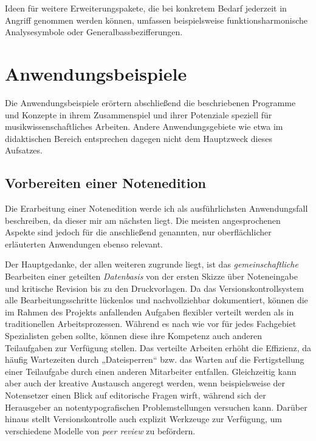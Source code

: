 \documentclass[DIV=12]{scrreprt}
\begin{document}
\bigskip
Ideen für weitere Erweiterungspakete, die bei konkretem Bedarf jederzeit in Angriff genommen werden können, umfassen beispielsweise funktionsharmonische Analysesymbole oder Generalbassbezifferungen.

\chapter{Anwendungsbeispiele}
\label{chap:pt_applications}

Die Anwendungsbeispiele erörtern abschließend die beschriebenen Programme und Konzepte in ihrem Zusammenspiel und ihrer Potenziale speziell für musikwissenschaftliches Arbeiten.
Andere Anwendungsgebiete wie etwa im didaktischen Bereich entsprechen dagegen nicht dem Hauptzweck dieses Aufsatzes.

\section{Vorbereiten einer Notenedition}
\label{sec:pt_preparing-edition}
Die Erarbeitung einer Notenedition werde ich als ausführlichsten Anwendungsfall beschreiben, da dieser mir am nächsten liegt.
Die meisten angesprochenen Aspekte sind jedoch für die anschließend genannten, nur oberflächlicher erläuterten Anwendungen ebenso relevant.

\medskip
 
Der Hauptgedanke, der allen weiteren zugrunde liegt, ist das \emph{gemeinschaftliche} Bearbeiten einer geteilten \emph{Datenbasis} von der ersten Skizze über Noteneingabe und kritische Revision bis zu den Druckvorlagen.
Da das Versionskontrollsystem alle Bearbeitungsschritte lückenlos und nachvollziehbar dokumentiert, können die im Rahmen des Projekts anfallenden Aufgaben flexibler verteilt werden als in traditionellen Arbeitsprozessen.
Während es nach wie vor für jedes Fachgebiet Spezialisten geben sollte, können diese ihre Kompetenz auch anderen Teilaufgaben zur Verfügung stellen.
Das verteilte Arbeiten erhöht die Effizienz, da häufig Wartezeiten durch „Dateisperren“ bzw. das Warten auf die Fertigstellung einer Teilaufgabe durch einen anderen Mitarbeiter entfallen.
Gleichzeitig kann aber auch der kreative Austausch angeregt werden, wenn beispielsweise der Notensetzer einen Blick auf editorische Fragen wirft, während sich der Herausgeber an notentypografischen Problemstellungen versuchen kann.
Darüber hinaus stellt Versionskontrolle auch explizit Werkzeuge zur Verfügung, um verschiedene Modelle von \emph{peer review} zu befördern.
\end{document}
